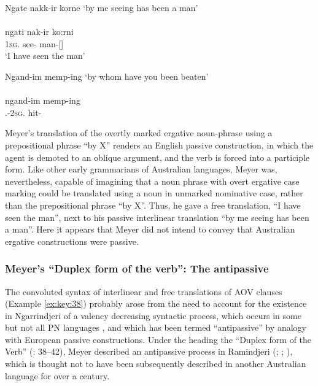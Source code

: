 \ea\label{ex:key:38}
	Ngate nakk-ir korne
	\glt `by me seeing has been a man' \\
	\citep[33]{meyer_vocabulary_1843} \\
	\gll ngati nak-ir ko:rni \\
	1\textsc{sg}.   see-   man-[] \\
	\glt `I have seen the man'
\z

\ea\label{ex:key:39}
	Ngand-im memp-ing 
	\glt `by whom have you been beaten' \\
	\citep[33]{meyer_vocabulary_1843} \\
	\gll  ngand-im memp-ing\\
	.-2\textsc{sg}. hit- \\
\z

Meyer’s translation of the overtly marked ergative noun-phrase using a prepositional phrase “by X” renders an English passive construction, in which the agent is demoted to an oblique argument, and the verb is forced into a participle form. Like other early grammarians of Australian languages, Meyer was, nevertheless, capable of imagining that a noun phrase with overt ergative case marking could be translated using a noun in unmarked nominative case, rather than the prepositional phrase ``by X''. Thus, he gave a free translation, ``I have seen the man'', next to his passive interlinear translation ``by me seeing has been a man''. Here it appears that Meyer did not intend to convey that Australian ergative constructions were passive.

\subsubsection{Meyer’s ``Duplex form of the verb'': The antipassive}
\label{sec:key:6.1.2.7}\label{bkm:Ref73965175}
\largerpage
The convoluted syntax of  interlinear and free translations of AOV clauses (Example \ref{ex:key:38}) probably arose from the need to account for the existence in Ngarrindjeri of a valency decreasing syntactic process, which occurs in some but not all PN languages \citep[206--207]{dixon_australian_2002}, and which has been termed “antipassive” \citep{Silverstein1972} by analogy with European passive constructions. Under the heading the “Duplex form of the Verb” (\citeyear{meyer_vocabulary_1843}: 38--42), Meyer described an antipassive process in Ramindjeri (\citealt{Terrill1997}; \citealt[206]{Dixon2002}; \citealt[146--152]{Dixon2004}), which is thought not to have been subsequently described in another Australian language for over a century.

